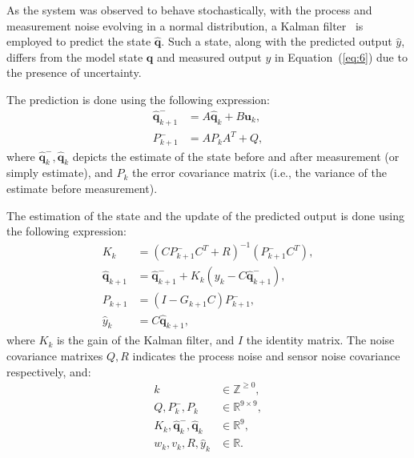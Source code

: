 \documentclass[letterpaper,10pt,conference]{ieeeconf}
\begin{document}
As the system was observed to behave stochastically, with the process and measurement noise evolving in a normal distribution, a Kalman filter~\cite{stengel1994optimal, simon2006optimal} is employed to predict the state $\hat{\mathbf{q}}$. Such a state, along with the predicted output $\hat{y}$, differs from the model state $\mathbf{q}$ and measured output $y$ in Equation~(\ref{eq:6}) due to the presence of uncertainty.

The prediction is done using the following expression:
\begin{subequations}\label{eq:7}\begin{align}
  \hat{\mathbf{q}}_{k+1}^-&=A\hat{\mathbf{q}}_{k}+B\mathbf{u}_k,\label{eq:7a}\\
  P_{k+1}^-&=AP_kA^T+Q,\label{eq:7b}
\end{align}\end{subequations}
where $\hat{\mathbf{q}}_k^-, \hat{\mathbf{q}}_k$ depicts the estimate of the state before and after measurement (or simply estimate), and $P_k$ the error covariance matrix (i.e., the variance of the estimate before measurement). 

The estimation of the state and the update of the predicted output is done using the following expression:
\begin{subequations}\label{eq:8}\begin{align}
  K_k&=(CP_{k+1}^-C^T+R)^{-1}(P_{k+1}^-C^T),\\
  \hat{\mathbf{q}}_{k+1}&=\hat{\mathbf{q}}_{k+1}^-+K_k(y_k-C\hat{\mathbf{q}}_{k+1}^-),\label{eq:8b}\\
  P_{k+1}&=(I-G_{k+1}C)P_{k+1}^-,\\
  \hat{y}_k&=C\hat{\mathbf{q}}_{k+1},\label{eq:8d}
\end{align}
\end{subequations}
where $K_k$ is the gain of the Kalman filter, and $I$ the identity matrix. The noise covariance matrixes $Q,R$ indicates the process noise and sensor noise covariance respectively, and:
\begin{equation}\label{eq:9}\begin{split}
  k&\in\mathbb{Z}^{\geq 0},\\
  Q,P_k^-,P_k&\in\mathbb{R}^{9\times 9},\\
  K_k,\hat{\mathbf{q}}_k^-,\hat{\mathbf{q}}_k&\in\mathbb{R}^9,\\
  w_k,v_k,R,\hat{y}_k&\in\mathbb{R}.\\
\end{split}\end{equation}
\end{document}

